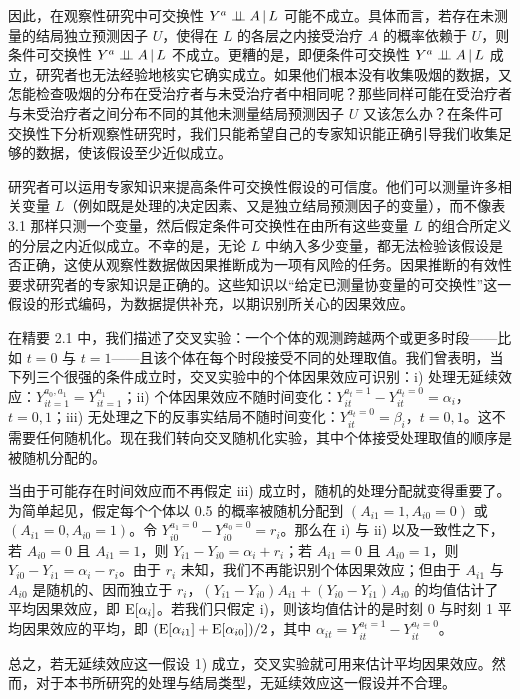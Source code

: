 
因此，在观察性研究中可交换性 $Y^{a}\perp\!\!\!\perp A\,|\, L$ 可能不成立。具体而言，若存在未测量的结局独立预测因子 $U$，使得在 $L$ 的各层之内接受治疗 $A$ 的概率依赖于 $U$，则条件可交换性 $Y^{a}\perp\!\!\!\perp A\,|\, L$ 不成立。更糟的是，即便条件可交换性 $Y^{a}\perp\!\!\!\perp A\,|\, L$ 成立，研究者也无法经验地核实它确实成立。如果他们根本没有收集吸烟的数据，又怎能检查吸烟的分布在受治疗者与未受治疗者中相同呢？那些同样可能在受治疗者与未受治疗者之间分布不同的其他未测量结局预测因子 $U$ 又该怎么办？在条件可交换性下分析观察性研究时，我们只能希望自己的专家知识能正确引导我们收集足够的数据，使该假设至少近似成立。

研究者可以运用专家知识来提高条件可交换性假设的可信度。他们可以测量许多相关变量 $L$（例如既是处理的决定因素、又是独立结局预测因子的变量），而不像表 3.1 那样只测一个变量，然后假定条件可交换性在由所有这些变量 $L$ 的组合所定义的分层之内近似成立。不幸的是，无论 $L$ 中纳入多少变量，都无法检验该假设是否正确，这使从观察性数据做因果推断成为一项有风险的任务。因果推断的有效性要求研究者的专家知识是正确的。这些知识以“给定已测量协变量的可交换性”这一假设的形式编码，为数据提供补充，以期识别所关心的因果效应。


\renewcommand{\FPname}{精要（Fine Point）}
\begin{finepoint}[交叉随机化实验]
在精要 2.1 中，我们描述了交叉实验：一个个体的观测跨越两个或更多时段——比如 $t=0$ 与 $t=1$——且该个体在每个时段接受不同的处理取值。我们曾表明，当下列三个很强的条件成立时，交叉实验中的个体因果效应可识别：i) 处理无延续效应：$Y_{it=1}^{a_0,a_1}=Y_{it=1}^{a_1}$；ii) 个体因果效应不随时间变化：$Y_{it}^{a_t=1}-Y_{it}^{a_t=0}=\alpha_i$，$t=0,1$；iii) 无处理之下的反事实结局不随时间变化：$Y_{it}^{a_t=0}=\beta_i$，$t=0,1$。这不需要任何随机化。现在我们转向交叉随机化实验，其中个体接受处理取值的顺序是被随机分配的。

当由于可能存在时间效应而不再假定 iii) 成立时，随机的处理分配就变得重要了。为简单起见，假定每个个体以 0.5 的概率被随机分配到 $(A_{i1}=1,A_{i0}=0)$ 或 $(A_{i1}=0,A_{i0}=1)$。令 $Y_{i0}^{a_1=0}-Y_{i0}^{a_0=0}=r_i$。那么在 i) 与 ii) 以及一致性之下，若 $A_{i0}=0$ 且 $A_{i1}=1$，则 $Y_{i1}-Y_{i0}=\alpha_i+r_i$；若 $A_{i1}=0$ 且 $A_{i0}=1$，则 $Y_{i0}-Y_{i1}=\alpha_i-r_i$。由于 $r_i$ 未知，我们不再能识别个体因果效应；但由于 $A_{i1}$ 与 $A_{i0}$ 是随机的、因而独立于 $r_i$，$(Y_{i1}-Y_{i0})A_{i1}+(Y_{i0}-Y_{i1})A_{i0}$ 的均值估计了平均因果效应，即 $\mathrm{E}[\alpha_i]$。若我们只假定 i)，则该均值估计的是时刻 0 与时刻 1 平均因果效应的平均，即 $(\mathrm{E}[\alpha_{i1}]+\mathrm{E}[\alpha_{i0}])/2$，其中 $\alpha_{it}=Y_{it}^{a_t=1}-Y_{it}^{a_t=0}$。

总之，若无延续效应这一假设 1) 成立，交叉实验就可用来估计平均因果效应。然而，对于本书所研究的处理与结局类型，无延续效应这一假设并不合理。
\end{finepoint}
\renewcommand{\FPname}{精要}

